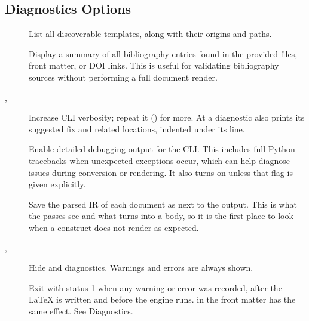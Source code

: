 \documentclass[a4paper,twoside]{article}
\begin{document}
\subsection{Diagnostics Options}
\begin{description}
\item[{}] List all discoverable templates, along with their origins and paths.
\item[{}] Display a summary of all bibliography entries found in the provided  files, front matter, or DOI links. This is useful for validating bibliography sources without performing a full document render.
\item[{, }] Increase CLI verbosity; repeat it () for more. At  a diagnostic also prints its suggested fix and related locations, indented under its line.
\item[{}] Enable detailed debugging output for the CLI. This includes full Python tracebacks when unexpected exceptions occur, which can help diagnose issues during conversion or rendering. It also turns  on unless that flag is given explicitly.
\item[{}] Save the parsed IR of each document as  next to the output. This is what the passes see and what  turns into a body, so it is the first place to look when a construct does not render as expected.
\item[{, }] Hide  and  diagnostics. Warnings and errors are always shown.
\item[{}] Exit with status 1 when any warning or error was recorded, after the \LaTeX{} is written and before the engine runs.  in the front matter has the same effect. See Diagnostics.

\end{description}
\end{document}
